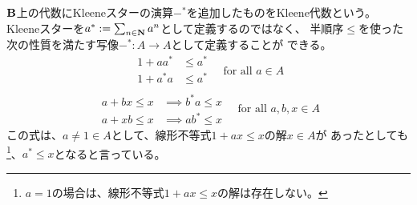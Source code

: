 {	$\mathbf{B}$上の代数にKleeneスターの演算$-^*$を追加したものをKleene代数という。
	Kleeneスターを$a^*:=\sum_{n\in\mathbf{N}}a^n$として定義するのではなく、
	半順序$\le$を使った次の性質を満たす写像$-^*:A\to A$として定義することが
	できる。
	\begin{equation}\label{eq:Kleeneスターの公理その一}\begin{split}
		1 + aa^* &\le a^* \\
		1 + a^*a &\le a^* \\
	\end{split}
		\quad\text{for all } a\in A
	\end{equation}
	\begin{equation}\label{eq:Kleeneスターの公理その二}\begin{split}
			a + bx \le x &\implies b^*a\le x \\
			a + xb \le x &\implies ab^*\le x 
	\end{split}
		\quad\text{for all } a,b,x\in A
	\end{equation}
	この式は、$a\neq1\in A$として、線形不等式$1+ax\le x$の解$x\in A$が
	あったとしても\footnote{
		$a=1$の場合は、線形不等式$1+ax\le x$の解は存在しない。
	}、$a^*\le x$となると言っている。

}
